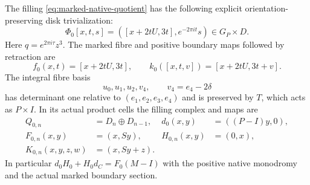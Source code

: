 \begin{theorem}\label{thm:marked-native-filling}
The filling \eqref{eq:marked-native-quotient} has the following
explicit orientation-preserving disk trivialization:
\begin{equation}\label{eq:marked-native-Phi}
 \Phi_0[x,t,s]=([x+2tU,3t],e^{-2\pi it}s)
                 \in G_P\times D.
\end{equation}
Here $q=e^{2\pi i\tau}z^3$. The marked fibre and positive
boundary maps followed by retraction are
\begin{equation}\label{eq:marked-native-FK}
 f_0(x,t)=[x+2tU,3t],\qquad
 k_0([x,t,v])=[x+2tU,3t+v].
\end{equation}
The integral fibre basis
\begin{equation}\label{eq:marked-cell-basis}
             u_0,u_1,u_2,v_4,\qquad v_4=e_4-2\delta
\end{equation}
has determinant one relative to $(e_1,e_2,e_3,e_4)$ and is
preserved by $T$, which acts as $P\times I$. In its actual
product cells the filling complex and maps are
\begin{equation}\label{eq:marked-final-chains}
 \begin{aligned}
 Q_{0,n}&=D_n\oplus D_{n-1},&d_0(x,y)&=((P-I)y,0),\\
 F_{0,n}(x,y)&=(x,Sy),&H_{0,n}(x,y)&=(0,x),\\
 K_{0,n}(x,y,z,w)&=(x,Sy+z).&&
 \end{aligned}
\end{equation}
In particular $d_0H_0+H_0d_C=F_0(M-I)$ with the positive
native monodromy and the actual marked boundary section.
\end{theorem}
